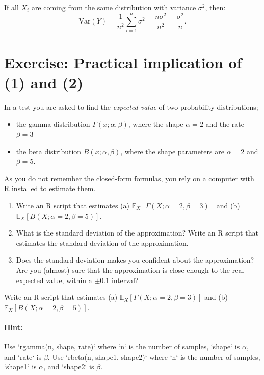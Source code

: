 \documentclass[11pt]{article}
\begin{document}
If all \(X_i\) are coming from the same distribution with variance \(\sigma^2\), then:
\[
  \text{Var}(Y) = \frac{1}{n^2} \sum_{i=1}^n \sigma^2 = \frac{n \sigma^2}{n^2} = \frac{\sigma^2}{n}.
\]

\fi

\section{Exercise: Practical implication of (1) and (2)}

In a test you are asked to find the \textit{expected value} of two probability distributions;
\begin{itemize}
\item the gamma distribution $\Gamma(x; \alpha, \beta)$, where the shape $\alpha = 2$ and the rate $\beta = 3$
\item the beta distribution $B(x; \alpha, \beta)$, where the shape parameters are \(\alpha = 2\) and \(\beta = 5\).
\end{itemize}

\noindent
As you do not remember the closed-form formulas, you rely on a computer with R installed to estimate them.

\begin{enumerate}
\item Write an R script that estimates (a) $\mathbb{E}_X[\Gamma(X; \alpha=2, \beta=3)]$ and (b) $\mathbb{E}_X[B(X; \alpha=2, \beta=5)]$.
\item What is the standard deviation of the approximation? Write an R script that estimates the standard deviation of the approximation.
\item Does the standard deviation makes you confident about the approximation? Are you (almost) sure that the approximation is close enough to the real expected value, within a $\pm 0.1$ interval?
\end{enumerate}

Write an R script that estimates (a) $\mathbb{E}_X[\Gamma(X; \alpha=2, \beta=3)]$ and (b) $\mathbb{E}_X[B(X; \alpha=2, \beta=5)]$.

\paragraph{Hint:}
Use `rgamma(n, shape, rate)` where `n` is the number of samples, `shape` is \(\alpha\), and `rate` is \(\beta\).
Use `rbeta(n, shape1, shape2)` where `n` is the number of samples, `shape1` is \(\alpha\), and `shape2` is \(\beta\).
\end{document}
